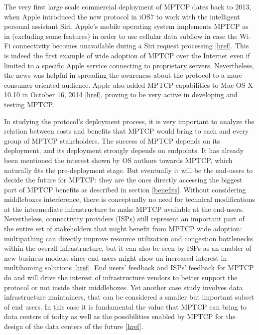 The very first large scale commercial deployment of MPTCP dates back to 2013, when Apple introduced the new protocol in iOS7 to work with the intelligent personal assistant Siri. Apple's mobile operating system implements MPTCP as in  (excluding some features) in order to use cellular data subflow in case the Wi-Fi connectivity becomes unavailable during a Siri request processing [\href{https://support.apple.com/en-us/HT201373}{href}]. This is indeed the first example of wide adoption of MPTCP over the Internet even if limited to a specific Apple service connecting to proprietary servers. Nevertheless, the news was helpful in spreading the awareness about the protocol to a more consumer-oriented audience. Apple also added MPTCP capabilities to Mac OS X 10.10 in October 16, 2014 [\href{http://labs.neohapsis.com/2014/10/20/mptcp-roams-free-by-default-os-x-yosemite/}{href}], proving to be very active in developing and testing MPTCP.

In studying the protocol's deployment process, it is very important to analyze the relation between costs and benefits that MPTCP would bring to each and every group of MPTCP stakeholders.
The success of MPTCP depends on its deployment, and its deployment strongly depends on endpoints. It has already been mentioned the interest shown by OS authors towards MPTCP, which naturally fits the pre-deployment stage. But eventually it will be the end-users to decide the future for MPTCP: they are the ones directly accessing the biggest part of MPTCP benefits as described in section \ref{benefits}. Without considering middleboxes interference, there is conceptually no need for technical modifications at the intermediate infrastructure to make MPTCP available at the end-users. Nevertheless, connectivity providers (ISPs) still represent an important part of the entire set of stakeholders that might benefit from MPTCP wide adoption: multipathing can directly improve resource utilization and congestion bottlenecks within the overall infrastructure, but it can also be seen by ISPs as an enabler of new business models, since end users might show an increased interest in multihoming solutions [\href{https://books.google.de/books?id=ECBxhiURlKYC&pg=PA23&lpg=PA23&dq=mptcp+deployment&source=bl&ots=_cvPxxdH6K&sig=P5AlF9bU_iE3C63HfXvgD77tUg8&hl=en&sa=X&ved=0ahUKEwi0wMnuscfKAhUB1hQKHT0cARsQ6AEIUzAI#v=onepage&q&f=false}{href}]. End users' feedback and ISPs' feedback for MPTCP do and will drive the interest of infrastructure vendors to better support the protocol or not inside their middleboxes. 
Yet another case study involves data infrastructure maintainers, that can be considered a smaller but important subset of end users. In this case it is fundamental the value that MPTCP can bring to data centers of today as well as the possibilities enabled by MPTCP for the design of the data centers of the future [\href{http://conferences.sigcomm.org/sigcomm/2011/papers/sigcomm/p266.pdf}{href}].

